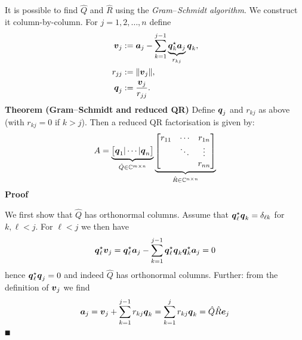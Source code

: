 It is possible to find $\hat Q$ and $\hat R$   using the \emph{Gram\ensuremath{\endash}Schmidt algorithm}. We construct it column-by-column. For $j = 1, 2, \ensuremath{\ldots}, n$ define
\begin{align*}
\bm{{\mbox{\boldmath$v$\unboldmath}}}_j &:= \bm{{\mbox{\boldmath$a$\unboldmath}}}_j - \sum_{k=1}^{j-1} \underbrace{\bm{{\mbox{\boldmath$q$\unboldmath}}}_k^\star \bm{{\mbox{\boldmath$a$\unboldmath}}}_j}_{r_{kj}} \bm{{\mbox{\boldmath$q$\unboldmath}}}_k, \\
r_{jj} &:= {\|\bm{{\mbox{\boldmath$v$\unboldmath}}}_j\|}, \\
\bm{{\mbox{\boldmath$q$\unboldmath}}}_j &:= {\bm{{\mbox{\boldmath$v$\unboldmath}}}_j \over r_{jj}}.
\end{align*}
\textbf{Theorem (Gram\ensuremath{\endash}Schmidt and reduced QR)} Define $\bm{{\mbox{\boldmath$q$\unboldmath}}}_j$ and $r_{kj}$ as above (with $r_{kj} = 0$ if $k > j$). Then a reduced QR factorisation is given by:
\[
A = \underbrace{\begin{bmatrix} \ensuremath{\bm{\q}}_1 | \ensuremath{\cdots} | \ensuremath{\bm{\q}}_n \end{bmatrix}}_{ \hat Q \ensuremath{\in} \ensuremath{\bbC}^{m \ensuremath{\times} n}} \underbrace{\begin{bmatrix} r_{11} & \ensuremath{\cdots} & r_{1n} \\ & \ensuremath{\ddots} & \ensuremath{\vdots} \\ && r_{nn}  \end{bmatrix}}_{\hat R \ensuremath{\in} \ensuremath{\bbC}^{n \ensuremath{\times} n}}
\]
\textbf{Proof}

We first show that $\hat Q$ has orthonormal columns. Assume that $\bm{{\mbox{\boldmath$q$\unboldmath}}}_\ell^\star \bm{{\mbox{\boldmath$q$\unboldmath}}}_k = \delta_{\ell k}$ for $k,\ensuremath{\ell} < j$.  For $\ensuremath{\ell} < j$ we then have
\[
\bm{{\mbox{\boldmath$q$\unboldmath}}}_\ell^\star \bm{{\mbox{\boldmath$v$\unboldmath}}}_j = \bm{{\mbox{\boldmath$q$\unboldmath}}}_\ell^\star \bm{{\mbox{\boldmath$a$\unboldmath}}}_j - \sum_{k=1}^{j-1}  \bm{{\mbox{\boldmath$q$\unboldmath}}}_\ell^\star\bm{{\mbox{\boldmath$q$\unboldmath}}}_k \bm{{\mbox{\boldmath$q$\unboldmath}}}_k^\star \bm{{\mbox{\boldmath$a$\unboldmath}}}_j = 0
\]
hence $\bm{{\mbox{\boldmath$q$\unboldmath}}}_\ell^\star \bm{{\mbox{\boldmath$q$\unboldmath}}}_j = 0$ and indeed $\hat Q$ has orthonormal columns. Further: from the definition of $\bm{{\mbox{\boldmath$v$\unboldmath}}}_j$ we find
\[
\bm{{\mbox{\boldmath$a$\unboldmath}}}_j = \bm{{\mbox{\boldmath$v$\unboldmath}}}_j + \sum_{k=1}^{j-1} r_{kj} \bm{{\mbox{\boldmath$q$\unboldmath}}}_k = \sum_{k=1}^j r_{kj} \bm{{\mbox{\boldmath$q$\unboldmath}}}_k  = \hat Q \hat R \bm{{\mbox{\boldmath$e$\unboldmath}}}_j
\]
\ensuremath{\QED}

